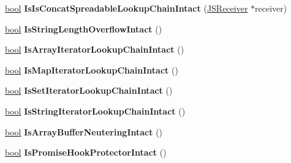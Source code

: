 \begin{DoxyCompactItemize}
\item 
\mbox{\label{classv8_1_1internal_1_1Isolate_af425440bc275ef33e1bcec70f69f60e3}} 
\mbox{\hyperlink{classbool}{bool}} {\bfseries Is\+Is\+Concat\+Spreadable\+Lookup\+Chain\+Intact} (\mbox{\hyperlink{classv8_1_1internal_1_1JSReceiver}{J\+S\+Receiver}} $\ast$receiver)
\item 
\mbox{\label{classv8_1_1internal_1_1Isolate_a73710416a8ee7b6653f887dc75ee31c3}} 
\mbox{\hyperlink{classbool}{bool}} {\bfseries Is\+String\+Length\+Overflow\+Intact} ()
\item 
\mbox{\label{classv8_1_1internal_1_1Isolate_ac14274082849c0cc6d253f9f794d0f3e}} 
\mbox{\hyperlink{classbool}{bool}} {\bfseries Is\+Array\+Iterator\+Lookup\+Chain\+Intact} ()
\item 
\mbox{\label{classv8_1_1internal_1_1Isolate_a1e03a365b549d4fca9b8a914f7399cd7}} 
\mbox{\hyperlink{classbool}{bool}} {\bfseries Is\+Map\+Iterator\+Lookup\+Chain\+Intact} ()
\item 
\mbox{\label{classv8_1_1internal_1_1Isolate_a1c1c0b2247fe5e787b95cee837b3a23e}} 
\mbox{\hyperlink{classbool}{bool}} {\bfseries Is\+Set\+Iterator\+Lookup\+Chain\+Intact} ()
\item 
\mbox{\label{classv8_1_1internal_1_1Isolate_a0d8018fdc87d6e545da7c279f3da2944}} 
\mbox{\hyperlink{classbool}{bool}} {\bfseries Is\+String\+Iterator\+Lookup\+Chain\+Intact} ()
\item 
\mbox{\label{classv8_1_1internal_1_1Isolate_abfb42664faaf5272fcd49a69ba805a6d}} 
\mbox{\hyperlink{classbool}{bool}} {\bfseries Is\+Array\+Buffer\+Neutering\+Intact} ()
\item 
\mbox{\label{classv8_1_1internal_1_1Isolate_ab54fbae14196835d50a9c661ac16b8f3}} 
\mbox{\hyperlink{classbool}{bool}} {\bfseries Is\+Promise\+Hook\+Protector\+Intact} ()
\item 
\mbox{\label{classv8_1_1internal_1_1Isolate_a4e9972146ddd064cba66a560c97208be}} 

\end{DoxyCompactItemize}
